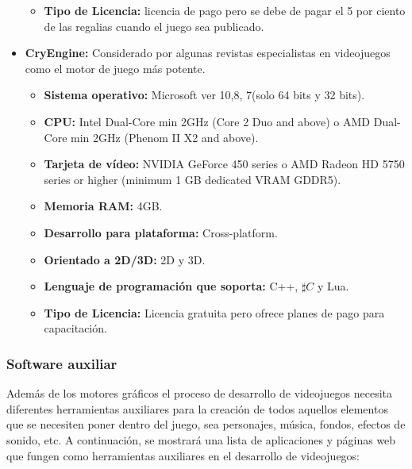 \begin{itemize}
\begin{itemize}
				\item \textbf{Tipo de Licencia:} licencia de pago pero se debe de pagar el 5 por ciento de las regalias cuando el juego sea publicado. \cite{Ref:Unreal}
			\end{itemize}
		\item \textbf{CryEngine:} Considerado por algunas revistas especialistas en videojuegos como el motor de juego más potente. 
			\begin{itemize}
				\item \textbf{Sistema operativo:} Microsoft ver 10,8, 7(solo 64 bits y 32 bits).
				\item \textbf{CPU:} Intel Dual-Core min 2GHz (Core 2 Duo and above) o AMD Dual-Core min 2GHz (Phenom II X2 and above).
				\item \textbf{Tarjeta de vídeo:} NVIDIA GeForce 450 series o AMD Radeon HD 5750 series or higher (minimum 1 GB dedicated VRAM GDDR5). 
				\item \textbf{Memoria RAM:} 4GB.
				\item \textbf{Desarrollo para plataforma:} Cross-platform.
				\item \textbf{Orientado a 2D/3D:} 2D y 3D.
				\item \textbf{Lenguaje de programación que soporta:} C++, $\sharp C$ y Lua.
				\item \textbf{Tipo de Licencia:} Licencia gratuita pero ofrece planes de pago para capacitación. \cite{Ref:CryEngine}
			\end{itemize}						
		
	\end{itemize}
	
	\subsubsection{Software auxiliar}
	Además de los motores gráficos el proceso de desarrollo de videojuegos necesita diferentes herramientas auxiliares para la creación de todos aquellos elementos que se necesiten poner dentro del juego, sea personajes, música, fondos, efectos de sonido, etc. A continuación, se mostrará una lista de aplicaciones y páginas web que fungen como herramientas auxiliares en el desarrollo de videojuegos:
	
